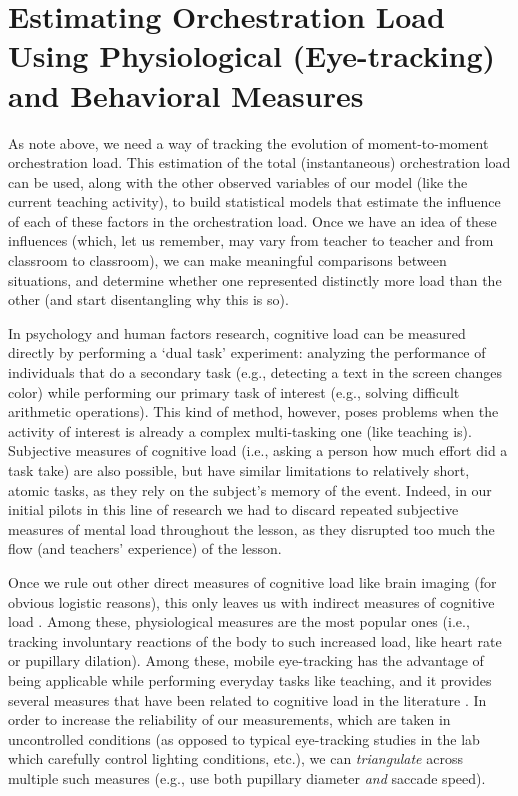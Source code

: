 \documentclass[10pt,journal,compsoc]{IEEEtran}
\begin{document}
\section{Estimating Orchestration Load Using Physiological (Eye-tracking) and Behavioral Measures}
\label{sec:measures}
As note above, we need a way of tracking the evolution of moment-to-moment orchestration load. This estimation of the total (instantaneous) orchestration load can be used, along with the other observed variables of our model (like the current teaching activity), to build statistical models that estimate the influence of each of these factors in the orchestration load. Once we have an idea of these influences (which, let us remember, may vary from teacher to teacher and from classroom to classroom), we can make meaningful comparisons between situations, and determine whether one represented distinctly more load than the other (and start disentangling why this is so).

In psychology and human factors research, cognitive load can be measured directly by performing a `dual task' experiment: analyzing the performance of individuals that do a secondary task (e.g., detecting a text in the screen changes color) while performing our primary task of interest (e.g., solving difficult arithmetic operations). This kind of method, however, poses problems when the activity of interest is already a complex multi-tasking one \cite{Paas2003} (like teaching is). Subjective measures of cognitive load (i.e., asking a person how much effort did a task take) are also possible, but have similar limitations to relatively short, atomic tasks, as they rely on the subject's memory of the event. Indeed, in our initial pilots in this line of research we had to discard repeated subjective measures of mental load throughout the lesson, as they disrupted too much the flow (and teachers' experience) of the lesson.

Once we rule out other direct measures of cognitive load like brain imaging (for obvious logistic reasons), this only leaves us with indirect measures of cognitive load \cite{Brunken2003}. Among these, physiological measures are the most popular ones (i.e., tracking involuntary reactions of the body to such increased load, like heart rate or pupillary dilation). Among these, mobile eye-tracking has the advantage of being applicable while performing everyday tasks like teaching, and it provides several measures that have been related to cognitive load in the literature \cite{boucsein2000engineering,Buettner2013}. In order to increase the reliability of our measurements, which are taken in uncontrolled conditions (as opposed to typical eye-tracking studies in the lab which carefully control lighting conditions, etc.), we can \textit{triangulate} across multiple such measures (e.g., use both pupillary diameter \textit{and} saccade speed).
\end{document}
